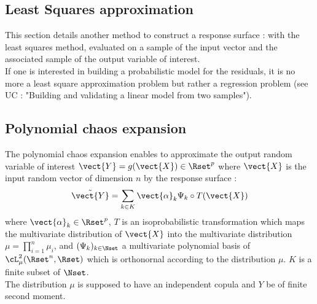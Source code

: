 



\newpage \subsection{Least Squares approximation}

This section details another method to construct a response surface : with the least squares method, evaluated on a sample of the input vector and the associated sample of the output variable of interest. \\
If one is interested in building a probabilistic model for the residuals, it is no more a least square approximation problem but rather a regression problem (see UC : "Building and validating a linear model from two samples").


\newpage 





\newpage \subsection{Polynomial chaos expansion}\label{polynomialchaosexpansion}



The polynomial chaos expansion enables to approximate the output random variable of interest $\vect{Y} = g(\vect{X}) \in \Rset^p$ where $\vect{X}$ is the input random vector of dimension $n$ by the  response surface :
\begin{align*}
\tilde{\vect{Y}} = \sum_{k \in K} \vect{\alpha}_k \Psi_k \circ T(\vect{X})
\end{align*}
where $ \vect{\alpha}_k \in \Rset^p$, $T$ is an isoprobabilistic transformation which maps the multivariate distribution of $\vect{X}$ into the multivariate distribution $\mu = \prod_{i=1}^n \mu_i$, and $(\Psi_k)_{k \in \Nset}$ a multivariate polynomial basis of $\cL^2_{\mu}(\Rset^n,\Rset)$ which is orthonornal according to the distribution $\mu$. $K$ is a finite subset of $\Nset$. \\
The distribution $\mu$ is supposed to have an independent copula and $Y$ be of finite second moment.



\newpage 
\newpage 
\newpage 

